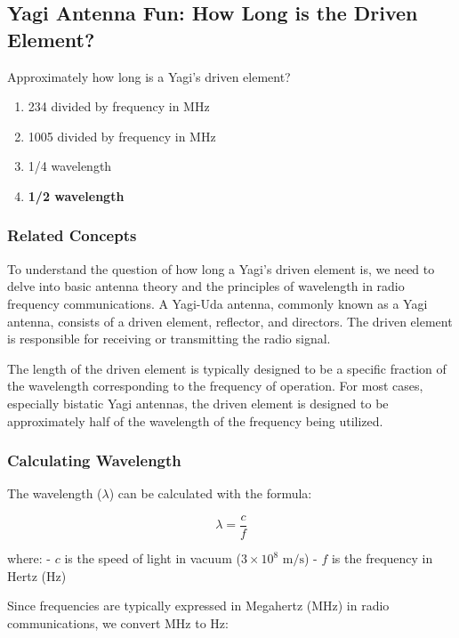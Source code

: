 \subsection{Yagi Antenna Fun: How Long is the Driven Element?}

\begin{tcolorbox}[colback=gray!10, colframe=black, title=E9D05] Approximately how long is a Yagi’s driven element?
\begin{enumerate}[label=\Alph*.]
    \item 234 divided by frequency in MHz
    \item 1005 divided by frequency in MHz
    \item 1/4 wavelength
    \item \textbf{1/2 wavelength}
\end{enumerate} \end{tcolorbox}

\subsubsection{Related Concepts}

To understand the question of how long a Yagi’s driven element is, we need to delve into basic antenna theory and the principles of wavelength in radio frequency communications. A Yagi-Uda antenna, commonly known as a Yagi antenna, consists of a driven element, reflector, and directors. The driven element is responsible for receiving or transmitting the radio signal.

The length of the driven element is typically designed to be a specific fraction of the wavelength corresponding to the frequency of operation. For most cases, especially bistatic Yagi antennas, the driven element is designed to be approximately half of the wavelength of the frequency being utilized.

\subsubsection{Calculating Wavelength}

The wavelength (\(\lambda\)) can be calculated with the formula:

\[
\lambda = \frac{c}{f}
\]

where:
- \(c\) is the speed of light in vacuum (\(3 \times 10^8 \text{ m/s}\))
- \(f\) is the frequency in Hertz (Hz)

Since frequencies are typically expressed in Megahertz (MHz) in radio communications, we convert MHz to Hz:

